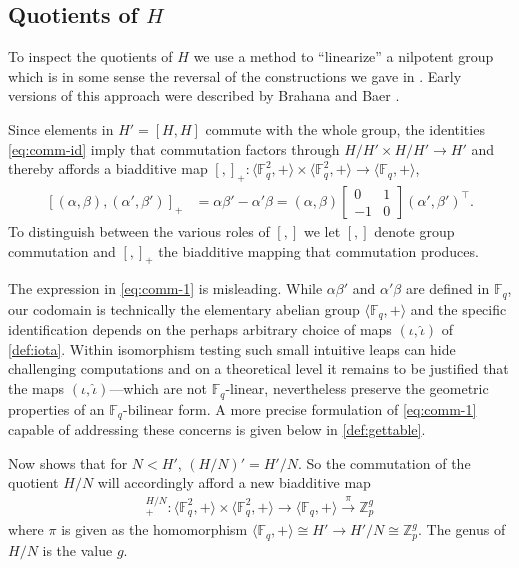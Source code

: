 \documentclass{toc}
\numberwithin{equation}{section}
\theoremstyle{plain}       %
\theoremstyle{remark}
\theoremstyle{definition}
\numberwithin{figure}{section}
\numberwithin{table}{section}
\newcommand{\bbF}{\mathbb{F}}  %
\begin{document}
\subsection{Quotients of \texorpdfstring{$H$}{H}}
To inspect the quotients of $H$ we  use a method to ``linearize'' a nilpotent
group which is in some sense the reversal of the constructions we gave in
.  Early versions of this approach were described by
Brahana and Baer \cite{Baer, Brahana}.

Since elements in $H'=[H,H]$ commute with the whole group, the identities
\eqref{eq:comm-id} imply that commutation factors through $H/H'\times H/H'\to
H'$ and thereby affords a biadditive map 
$[,]_+:\langle \bbF_q^2,+\rangle\times \langle \bbF_q^2,+\rangle\to 
		\langle \bbF_q,+\rangle$,
\begin{align}\label{eq:comm-1}
	[(\alpha,\beta),(\alpha',\beta')]_+ & = \alpha \beta'-\alpha'\beta
		=(\alpha,\beta)\begin{bmatrix} 0 & 1\\ -1 & 0\end{bmatrix} 
			(\alpha',\beta')^{\top}.
\end{align}
To distinguish between the various roles of $[,]$ we let $[,]$ denote group
commutation and $[,]_+$ the biadditive mapping that commutation produces.

\begin{remark}\label{rem:iota}
  The expression in \eqref{eq:comm-1} is misleading.  While
  $\alpha\beta'$ and $\alpha'\beta$ are defined in $\bbF_{q}$, our
  codomain is technically the elementary abelian group
  $\langle \bbF_{q},+\rangle$ and the specific identification depends
  on the perhaps arbitrary choice of maps $(\iota,\hat{\iota})$ of
  \eqref{def:iota}.  Within isomorphism testing such small intuitive
  leaps can hide challenging computations and on a theoretical level
  it remains to be justified that the maps
  $(\iota,\hat{\iota})$---which are not $\bbF_{q}$-linear,
  nevertheless preserve the geometric properties of an
  $\bbF_{q}$-bilinear form.  A more precise formulation of
  \eqref{eq:comm-1} capable of addressing these concerns is given
  below in \eqref{def:gettable}.
\end{remark}

Now  shows that for $N<H'$, $(H/N)'=H'/N$.  So the
commutation of the quotient $H/N$ will accordingly afford a new biadditive map
\begin{align*}
	[,]_+^{H/N}:\langle \bbF_q^2,+\rangle\times \langle \bbF_q^2,+\rangle\to 
		\langle \bbF_q,+\rangle
	\overset{\pi}{\to} \mathbb{Z}_p^g 
\end{align*}
where $\pi$ is given as the homomorphism $\langle \bbF_q,+\rangle\cong H'\to
H'/N\cong \mathbb{Z}_p^g$. The genus of $H/N$ is the value $g$.  
\end{document}
